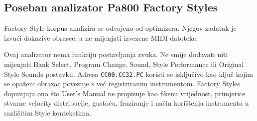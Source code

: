 \documentclass[11pt]{article}
\begin{document}
\subsection{Poseban analizator Pa800 Factory Styles}

Factory Style korpus analizira se odvojeno od optimizera. Njegov zadatak je
izvući dokazive obrasce, a ne mijenjati izvezene MIDI datoteke.

Ovaj analizator nema funkciju postavljanja zvuka. Ne smije dodavati niti
mijenjati Bank Select, Program Change, Sound, Style Performance ili Original
Style Sounds postavku. Adresa \texttt{CC00.CC32.PC} koristi se isključivo kao
ključ kojim se opaženi obrazac povezuje s već registriranim instrumentom.
Factory Styles dopunjuju ono što User's Manual ne propisuje kao fiksnu
vrijednost, primjerice stvarne velocity distribucije, gustoću, fraziranje i
način korištenja instrumenta u različitim Style kontekstima.
\end{document}
